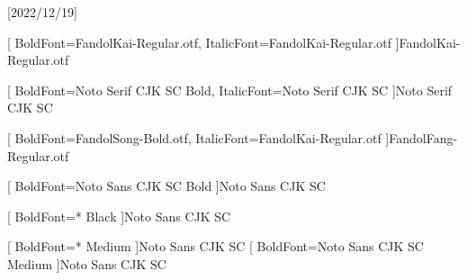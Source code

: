 
[2022/12/19]

\setsansfont{TeX Gyre Heros}	%





[
	BoldFont=FandolKai-Regular.otf, ItalicFont=FandolKai-Regular.otf
]{FandolKai-Regular.otf}

[
	BoldFont=Noto Serif CJK SC Bold,
	ItalicFont=Noto Serif CJK SC
]{Noto Serif CJK SC}

[
	BoldFont=FandolSong-Bold.otf,
	ItalicFont=FandolKai-Regular.otf
]{FandolFang-Regular.otf}

[
	BoldFont=Noto Sans CJK SC Bold
]{Noto Sans CJK SC}


[
	BoldFont=* Black
]{Noto Sans CJK SC}

[
	BoldFont=* Medium
]{Noto Sans CJK SC}	%
[
	BoldFont=Noto Sans CJK SC Medium
]{Noto Sans CJK SC}	%


\newcommand\kaishu{\CJKfamily{kai}} %
\newcommand\songti{\CJKfamily{song}} %
\newcommand\heiti{\CJKfamily{hei}}	%
\newcommand\thmheiti{\CJKfamily{hei2}}	%
\newcommand\fangsong{\CJKfamily{fangsong}} %
\renewcommand{\em}{\bfseries\mathversion{bold}\CJKfamily{emfont}} %